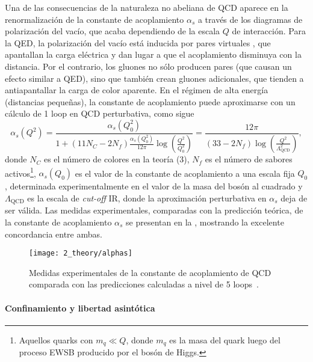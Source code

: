 Una de las consecuencias de la naturaleza no abeliana de \ac{QCD} aparece en la renormalización de la constante de acoplamiento \(\alpha_s\) a través de los diagramas de polarización del vacío, que acaba dependiendo de la escala \(Q\) de interacción. Para la \ac{QED}, la polarización del vacío está inducida por pares virtuales \ee, que apantallan la carga eléctrica y dan lugar a que el acoplamiento disminuya con la distancia. Por el contrario, los gluones no sólo producen pares \qqbar (que causan un efecto similar a \ac{QED}), sino que también crean gluones adicionales, que tienden a antiapantallar la carga de color aparente. En el régimen de alta energía (distancias pequeñas), la constante de acoplamiento puede aproximarse con un cálculo de 1 loop en \ac{QCD} perturbativa, como sigue
\begin{equation}
    \label{eq:theory:sm:mathematical:qcd:alphas}
    \alpha_s\left(Q^2\right) = 
    \frac{
        \alpha_s\left(Q^2_0\right)
    }{
        1 + \left(11 N_C - 2 N_f\right) \frac{\alpha_s\left(Q_0^2\right)}{12\pi} \log \left(\frac{Q^2}{Q_0^2}\right)
    }
    =
    \frac{
        12\pi
    }{
        \left(33 - 2 N_f\right)  \log \left(\frac{Q^2}{\Lambda_{\text{QCD}}^2}\right)
    },
\end{equation}
donde \(N_C\) es el número de colores en la teoría (3), \(N_f\) es el número de sabores activos\footnote{Aquellos quarks con \(m_q \ll Q\), donde \(m_q\) es la masa del quark luego del proceso \ac{EWSB} producido por el bosón de Higgs.}, \(\alpha_s\left(Q_0\right)\) es el valor de la constante de acoplamiento a una escala fija \(Q_0\), determinada experimentalmente en el valor de la masa del bosón \Zboson al cuadrado y \(\Lambda_{\text{QCD}}\) es la escala de \textit{cut-off} \ac{IR}, donde la aproximación perturbativa en \(\alpha_s\) deja de ser válida. Las medidas experimentales, comparadas con la predicción teórica, de la constante de acoplamiento \(\alpha_s\) se presentan en la \Fig{\ref{fig:theory:sm:mathematical:qcd:alphas}}, mostrando la excelente concordancia entre ambas.

\begin{figure}[ht!]
    \centering
    \texttt{[image: 2\_theory/alphas]}
    \caption{Medidas experimentales de la constante de acoplamiento de \ac{QCD} comparada con las predicciones calculadas a nivel de 5 loops~\cite{ParticleDataGroup2024}.}
    \label{fig:theory:sm:mathematical:qcd:alphas}
\end{figure}


\paragraph{Confinamiento y libertad asintótica}

